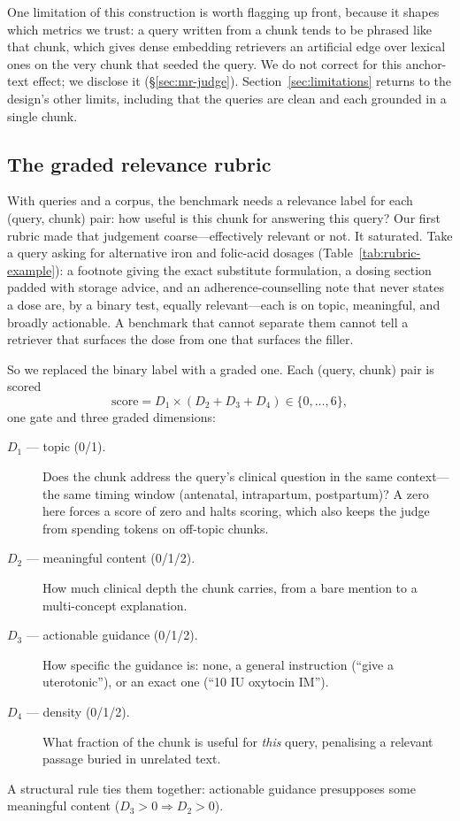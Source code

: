One limitation of this construction is worth flagging up front, because it
shapes which metrics we trust: a query written from a chunk tends to be phrased
like that chunk, which gives dense embedding retrievers an artificial edge over
lexical ones on the very chunk that seeded the query. We do not correct for this
anchor-text effect; we disclose it (\S\ref{sec:mr-judge}).
Section~\ref{sec:limitations} returns to the design's other limits, including
that the queries are clean and each grounded in a single chunk.

\subsection{The graded relevance rubric}
\label{sec:mr-rubric}

With queries and a corpus, the benchmark needs a relevance label for each
(query, chunk) pair: how useful is this chunk for answering this query? Our first
rubric made that judgement coarse---effectively relevant or not. It saturated. Take a query
asking for alternative iron and folic-acid dosages (Table~\ref{tab:rubric-example}):
a footnote giving the exact substitute formulation, a dosing section padded with
storage advice, and an adherence-counselling note that never states a dose are,
by a binary test, equally relevant---each is on topic, meaningful, and broadly
actionable. A
benchmark that cannot separate them cannot tell a retriever that surfaces the
dose from one that surfaces the filler.

So we replaced the binary label with a graded one. Each (query, chunk) pair is
scored
\[
  \mathrm{score} = D_1 \times (D_2 + D_3 + D_4) \in \{0,\dots,6\},
\]
one gate and three graded dimensions:
\begin{description}
  \item[$D_1$ --- topic (0/1).] Does the chunk address the query's clinical
  question in the same context---the same timing window (antenatal,
  intrapartum, postpartum)? A zero here forces a score of zero and halts
  scoring, which also keeps the judge from spending tokens on off-topic chunks.
  \item[$D_2$ --- meaningful content (0/1/2).] How much clinical depth the chunk
  carries, from a bare mention to a multi-concept explanation.
  \item[$D_3$ --- actionable guidance (0/1/2).] How specific the guidance is:
  none, a general instruction (``give a uterotonic''), or an exact one
  (``10 IU oxytocin IM'').
  \item[$D_4$ --- density (0/1/2).] What fraction of the chunk is useful for
  \emph{this} query, penalising a relevant passage buried in unrelated text.
\end{description}
A structural rule ties them together: actionable guidance presupposes some
meaningful content ($D_3 > 0 \Rightarrow D_2 > 0$).

